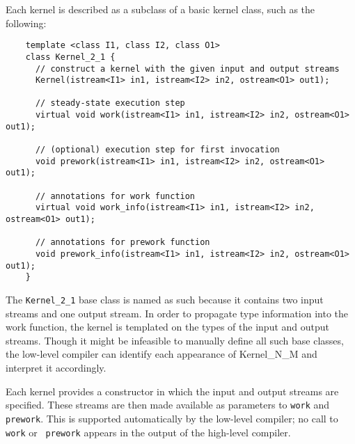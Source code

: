 Each kernel is described as a subclass of a basic kernel class, such
as the following:
{\small
\begin{verbatim}
    template <class I1, class I2, class O1>
    class Kernel_2_1 {
      // construct a kernel with the given input and output streams
      Kernel(istream<I1> in1, istream<I2> in2, ostream<O1> out1);

      // steady-state execution step
      virtual void work(istream<I1> in1, istream<I2> in2, ostream<O1> out1);

      // (optional) execution step for first invocation
      void prework(istream<I1> in1, istream<I2> in2, ostream<O1> out1);

      // annotations for work function
      virtual void work_info(istream<I1> in1, istream<I2> in2, ostream<O1> out1);

      // annotations for prework function
      void prework_info(istream<I1> in1, istream<I2> in2, ostream<O1> out1);
    }  
\end{verbatim}}

The {\tt Kernel\_2\_1} base class is named as such because it contains
two input streams and one output stream.  In order to propagate type
information into the work function, the kernel is templated on the
types of the input and output streams.  Though it might be infeasible
to manually define all such base classes, the low-level compiler can
identify each appearance of Kernel\_N\_M and interpret it accordingly.

Each kernel provides a constructor in which the input and output
streams are specified.  These streams are then made available as
parameters to {\tt work} and {\tt prework}.  This is supported
automatically by the low-level compiler; no call to {\tt work} or {\tt
prework} appears in the output of the high-level compiler.


